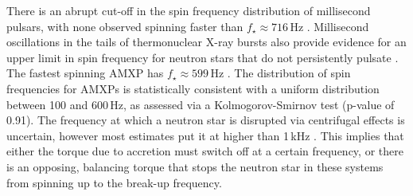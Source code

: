 There is an abrupt cut-off in the spin frequency distribution of millisecond pulsars, with none observed spinning faster than $f_\star \approx 716\,$Hz \citep{Hessels2006}. Millisecond oscillations in the tails of thermonuclear X-ray bursts also provide evidence for an upper limit in spin frequency for neutron stars that do not persistently pulsate \citep{Chakrabarty2003}. The fastest spinning AMXP has $f_\star \approx 599\,$Hz \citep{Patruno0029}. The distribution of spin frequencies for AMXPs is statistically consistent with a uniform distribution between 100 and 600\,Hz, as assessed via a Kolmogorov-Smirnov test (p-value of 0.91). The frequency at which a neutron star is disrupted via centrifugal effects is uncertain, however most estimates put it at higher than 1\,kHz \citep{Cook1994}. This implies that either the torque due to accretion must switch off at a certain frequency, or there is an opposing, balancing torque that stops the neutron star in these systems from spinning up to the break-up frequency. 

